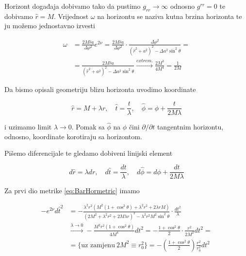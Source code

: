 \noindent Horizont događaja dobivamo tako da pustimo $g_{rr}\to\infty$ odnosno $g^{rr}=0$ te dobivamo $\hat{r}=M$. Vrijednost $\omega$ na horizontu se naziva kutna brzina horizonta te ju možemo jednostavno izvesti

\begin{equation}
\begin{split}
\omega&=\frac{2M\hat{r}a}{\Delta\rho^2}e^{2\nu}=\frac{2M\hat{r}a}{\Delta\rho^2}\cdot\frac{\Delta\rho^2}{(\hat{r}^2+a^2)^2-\Delta a^2\sin^2\theta}=\\
&=\frac{2M\hat{r}a}{(\hat{r}^2+a^2)^2-\Delta a^2\sin^2\theta}\xrightarrow{extrem.}\frac{2M^3}{4M^4}=\frac{1}{2M}
\end{split}
\end{equation}

\noindent Da bismo opisali geometriju blizu horizonta uvodimo koordinate

\begin{equation}
\hat{r}=M+\lambda r,\quad \hat{t}=\frac{t}{\lambda},\quad \hat{\phi}=\phi+\frac{t}{2M\lambda}
\end{equation}

\noindent i uzimamo limit $\lambda\to 0$. Pomak sa $\hat{\phi}$ na $\phi$ čini $\partial/\partial t$ tangentnim horizontu, odnosno, koordinate korotiraju sa horizontom.\medskip

\noindent Pišemo diferencijale te gledamo dobiveni linijski element

\begin{equation}
d\hat{r}=\lambda dr,\quad d\hat{t}=\frac{dt}{\lambda},\quad d\hat{\phi}=d\phi+\frac{dt}{2M\lambda}
\end{equation}

\noindent Za prvi dio metrike \eqref{eq:BarHormetric} imamo

\begin{equation}
\begin{split}
-e^{2\nu}d\hat{t}^2&=-\frac{\lambda^2 r^2\left(M^2(1+\cos^2\theta)+\lambda^2 r^2+2\lambda r M\right)}{(2M^2+\lambda^2 r^2+2M\lambda r)^2-\lambda^2 r^2 M^2\sin^2\theta}\cdot\frac{dt^2}{\lambda}\\
&\xrightarrow{\lambda\to 0}-\frac{M^2 r^2(1+\cos^2\theta)}{4M^4}dt^2=-\frac{1+\cos^2\theta}{2}\cdot\frac{r^2}{2M^2}dt^2=\\
&=\Big\{\textrm{uz zamjenu}\ 2M^2\equiv r_0^2\Big\}=-\left(\frac{1+\cos^2\theta}{2}\right)\frac{r^2}{r_0^2}dt^2
\end{split}
\end{equation}

